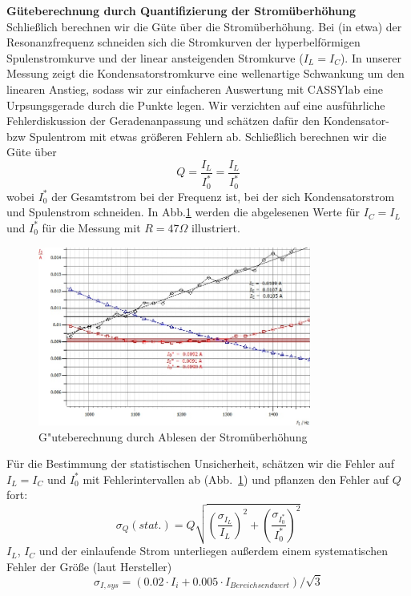 \documentclass[12pt,a4paper]{article}
\begin{document}
\textbf{Güteberechnung durch Quantifizierung der Stromüberhöhung}\\
Schließlich berechnen wir die Güte über die Stromüberhöhung. Bei (in etwa) der Resonanzfrequenz schneiden sich die Stromkurven der hyperbelförmigen Spulenstromkurve und der linear ansteigenden Stromkurve ($I_L=I_C$). In unserer Messung zeigt die Kondensatorstromkurve eine wellenartige Schwankung um den linearen Anstieg, sodass wir zur einfacheren Auswertung mit CASSYlab eine Urpsungsgerade durch die Punkte legen.  Wir verzichten auf eine ausführliche Fehlerdiskussion der Geradenanpassung und schätzen dafür den Kondensator- bzw Spulentrom mit etwas größeren Fehlern ab. Schließlich berechnen wir die Güte über 
\begin{equation}
Q=\frac{I_L}{I_0^*}=\frac{I_L}{I_0^*}
\end{equation}
wobei $I_0^*$ der Gesamtstrom bei der Frequenz ist, bei der sich Kondensatorstrom und Spulenstrom schneiden. In Abb.\ref{P47Ohm_I} werden die abgelesenen Werte für $I_C=I_L$ und $I_0^*$ für die Messung mit $R=47\Omega$ illustriert.
\begin{figure}[H]
	\centering
	\includegraphics[width=0.8\textwidth]{Daten/P47Ohm_I.jpg}
	\caption{G"uteberechnung durch Ablesen der Stromüberhöhung}
	\label{P47Ohm_I}
\end{figure}
Für die Bestimmung der statistischen Unsicherheit, schätzen wir die Fehler auf $I_L=I_C$ und $I_0^*$ mit Fehlerintervallen ab (Abb.~\ref{P47Ohm_I}) und pflanzen den Fehler auf $Q$ fort:
\begin{equation}
\sigma_Q(stat.)=Q\sqrt{\left(\frac{\sigma_{I_L}}{I_L}\right)^2+\left(\frac{\sigma_{I_0^*}}{I_0^*}\right)^2}
\end{equation}
$I_L$, $I_C$ und der einlaufende Strom unterliegen außerdem einem systematischen Fehler der Größe (laut Hersteller)
\begin{equation}
\sigma_{I,sys}=(0.02\cdot I_i+0.005\cdot I_{Bereichsendwert})/\sqrt{3}
\end{equation}
\end{document}
